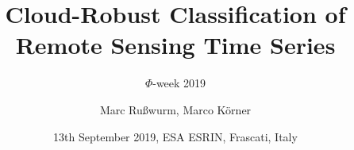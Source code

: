\documentclass[%
  aspectratio=169,
  9pt,
  english,
  light,
  mathserif,
  professionalfont,
  affiliationintitlepagehead,
  titlegraphic,
   affiliation,
]{beamer}
\title{Cloud-Robust Classification of Remote Sensing Time Series}
\subtitle{$\Phi$-week 2019}
\author[M. Rußwurm, M. Körner]{Marc Rußwurm, Marco Körner}
\institute[TUM]{%
}
\date{13th September 2019, ESA ESRIN, Frascati, Italy}
\begin{document}
\begin{frame}[t]
  \titlepage
\end{frame}

%	
%
%

	
\end{document}
